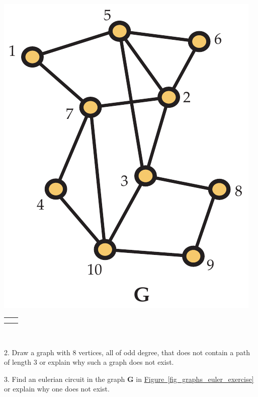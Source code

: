 \documentclass[10pt,]{book}
\theoremstyle{plain}
\theoremstyle{definition}
\theoremstyle{definition}
\theoremstyle{definition}
\theoremstyle{definition}
\numberwithin{equation}{section}
\newlength{\panelmax}
\newcommand{\bfG}{\mathbf{G}}
\begin{document}
\begin{exerciselist}
{\begin{lrbox}{\panelboxAimage}
\includegraphics[width=0.35\linewidth]{images/graph_ex}
\end{lrbox}
\ifdefined\phAimage\else\newlength{\phAimage}\fi%
\setlength{\phAimage}{\ht\panelboxAimage+\dp\panelboxAimage}
\settototalheight{\phAimage}{\usebox{\panelboxAimage}}
\setlength{\panelmax}{\maxof{\panelmax}{\phAimage}}
\leavevmode%
\setlength{\tabcolsep}{0.0125\linewidth}
\par\medskip\noindent
\hspace*{0.0125\linewidth}%
\begin{tabular}{@{}*{2}{c}@{}}
\begin{minipage}[c][\panelmax][t]{0.6\linewidth}\usebox{\panelboxAol}\end{minipage}&
\begin{minipage}[c][\panelmax][t]{0.35\linewidth}\usebox{\panelboxAimage}\end{minipage}\tabularnewline
&
\parbox[t]{0.35\linewidth}{
}\end{tabular}\\
}%
\par\smallskip
\item[2.]\hypertarget{exercise-10}{}\hypertarget{p-146}{}%
Draw a graph with \(8\) vertices, all of odd degree, that does not contain a path of length \(3\) or explain why such a graph does not exist.%
\par\smallskip
\item[3.]\hypertarget{exercise-11}{}\hypertarget{p-147}{}%
Find an eulerian circuit in the graph \(\bfG\) in \hyperref[fig_graphs_euler_exercise]{Figure~\ref{fig_graphs_euler_exercise}} or explain why one does not exist.%
\begin{figure}

\end{figure}
\end{exerciselist}
\end{document}
